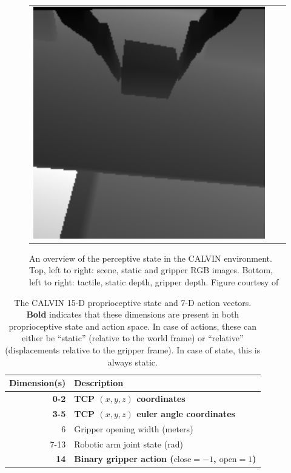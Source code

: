 \documentclass[../main.tex]{subfiles}
\begin{document}
\begin{figure}[t]
\begin{tabular}{c c c}
		\includegraphics[width=0.32\linewidth]{figures/calvin/depth_gripper.png}
	\end{tabular}
	\caption[The available perceptive state in the CALVIN environment.]{An overview of
		the perceptive state in the CALVIN environment. Top, left to right: scene, static and gripper RGB
		images. Bottom, left to right: tactile, static depth, gripper depth. Figure courtesy
		of~\citet{mees_calvin_2022}}
	\label{fig:calvin}
\end{figure}

\begin{table}[t]
	\centering
	\caption[The CALVIN 15-D proprioceptive state and 7-D action vectors.]{The CALVIN 15-D
		proprioceptive state and 7-D action vectors. \textbf{Bold} indicates that these dimensions are
		present in both proprioceptive state and action space. In case of actions, these can either be
		``static'' (relative to the world frame) or ``relative'' (displacements relative to the
		gripper frame). In case of state, this is always static.}
	\label{tab:calvin-proprio}
	\begin{tabular}{@{}rl@{}}
		\toprule
		Dimension(s) & Description                                                             \\ \midrule
		\textbf{0-2} & \textbf{TCP $(x, y, z)$ coordinates}                                    \\
		\textbf{3-5} & \textbf{TCP $(x, y, z)$ euler angle coordinates}                        \\
		6            & Gripper opening width (meters)                                          \\
		7-13         & Robotic arm joint state (rad)                                           \\
		\textbf{14}  & \textbf{Binary gripper action ($\text{close} = -1$, $\text{open} = 1$)} \\ \bottomrule
	\end{tabular}
\end{table}
\end{document}
